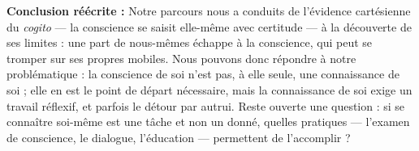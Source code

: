 \documentclass[11pt]{article}
\begin{document}
\begin{corrige}
\begin{enumerate}
\textbf{Conclusion réécrite :} Notre parcours nous a conduits de l'évidence cartésienne du \emph{cogito} --- la conscience se saisit elle-même avec certitude --- à la découverte de ses limites : une part de nous-mêmes échappe à la conscience, qui peut se tromper sur ses propres mobiles. Nous pouvons donc répondre à notre problématique : la conscience de soi n'est pas, à elle seule, une connaissance de soi ; elle en est le point de départ nécessaire, mais la connaissance de soi exige un travail réflexif, et parfois le détour par autrui. Reste ouverte une question : si se connaître soi-même est une tâche et non un donné, quelles pratiques --- l'examen de conscience, le dialogue, l'éducation --- permettent de l'accomplir ?
\end{enumerate}
\end{corrige}
\end{document}

